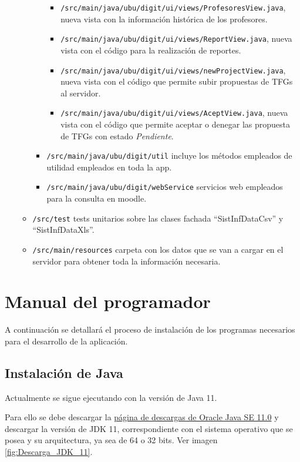 \begin{itemize}
\begin{itemize}
\begin{itemize}
					\begin{itemize}
						\item \texttt{/src/main/java/ubu/digit/ui/views/ProfesoresView.java}, nueva vista con la información histórica de los profesores.
						\item \texttt{/src/main/java/ubu/digit/ui/views/ReportView.java}, nueva vista con el código para la realización de reportes.
						\item \texttt{/src/main/java/ubu/digit/ui/views/newProjectView.java}, nueva vista con el código que permite subir propuestas de TFGs al servidor.
						\item \texttt{/src/main/java/ubu/digit/ui/views/AceptView.java}, nueva vista con el código que permite aceptar o denegar las propuesta de TFGs con estado \emph{Pendiente}.
					\end{itemize}
				\item \texttt{/src/main/java/ubu/digit/util} incluye los métodos empleados de utilidad empleados en toda la app. 
				\item \texttt{/src/main/java/ubu/digit/webService} servicios web empleados para la consulta en moodle.
			\end{itemize}
			
			\item \texttt{/src/test} tests unitarios sobre las clases fachada “SistInfDataCsv” y “SistInfDataXls”.
			
			\item \texttt{/src/main/resources} carpeta con los datos que se van a cargar en el servidor para obtener toda la información necesaria.
		\end{itemize}
	
\end{itemize}
			
\section{Manual del programador}

A continuación se detallará el proceso de instalación de los programas
necesarios para el desarrollo de la aplicación.

\subsection{Instalación de Java}

Actualmente se sigue ejecutando con la versión de Java 11.

Para ello se debe descargar la \href{https://www.oracle.com/es/java/technologies/javase/jdk11-archive-downloads.html}{página de descargas de Oracle Java SE 11.0} y descargar la versión de JDK 11, correspondiente con el sistema operativo que se posea y su arquitectura, ya sea de 64 o 32 bits. Ver imagen \ref{fig:Descarga_JDK_11}.

